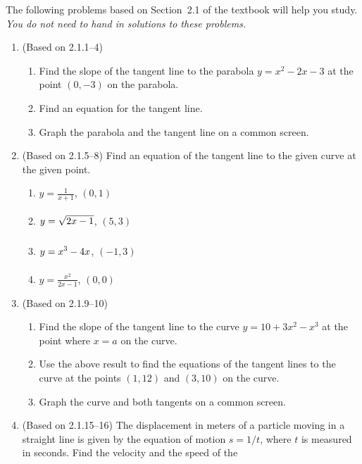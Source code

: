 \documentclass{article}
\title{\commonPSTitleZeroTwoOne}
\author{\commonAuthor}
\date{\commonDateZeroTwoOne}
\newcommand{\ds}{\displaystyle}
\begin{document}
\maketitle
\thispagestyle{empty}

\noindent
The following problems based on Section~2.1 of the textbook will help
you study.  \emph{You do not need to hand in solutions to these
  problems.}
\begin{enumerate}
\item (Based on 2.1.1--4) %
  \begin{enumerate}
  \item Find the slope of the tangent line to the parabola
    $\ds y=x^2-2x-3$ at the point $\ds (0,-3)$ on the parabola.
  \item Find an equation for the tangent line.
  \item Graph the parabola and the tangent line on a common screen.
  \end{enumerate}
\item (Based on 2.1.5--8) %
  Find an equation of the tangent line to the given curve at the given
  point.
  \begin{multicols}{4}
  \begin{enumerate}
  \item $\ds y=\frac{1}{x+1}$, $\ds (0,1)$
  \item $\ds \vphantom{\frac{1}{1}} y=\sqrt{2x-1}$, $\ds (5,3)$
  \item $\ds \vphantom{\frac{1}{1}} y=x^3-4x$, $\ds (-1,3)$
  \item $\ds y=\frac{x^2}{2x-1}$, $\ds (0,0)$
  \end{enumerate}
  \end{multicols}
\item (Based on 2.1.9--10) %
  \begin{enumerate}
  \item Find the slope of the tangent line to the curve
    $\ds y=10+3x^2-x^3$ at the point where $\ds x=a$ on the curve.
  \item Use the above result to find the equations of the tangent
    lines to the curve at the points $(1,12)$ and $(3,10)$ on the
    curve.
  \item Graph the curve and both tangents on a common screen.
  \end{enumerate}
\item (Based on 2.1.15--16) %
  The displacement in meters of a particle moving in a straight line
  is given by the equation of motion $\ds s=1/t$, where $t$ is
  measured in seconds.  Find the velocity and the speed of the

\end{enumerate}
\end{document}
